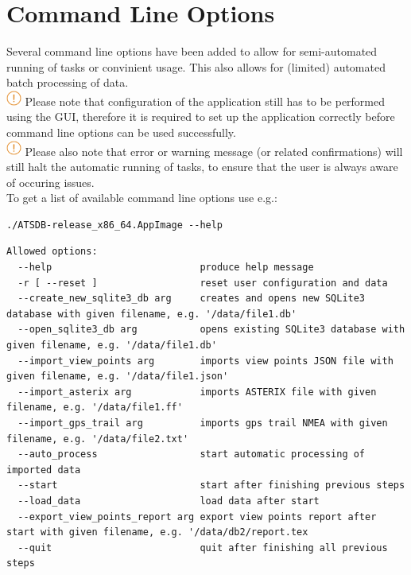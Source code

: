 \chapter{Command Line Options}
\label{sec:command_line} 

Several command line options have been added to allow for semi-automated running of tasks or convinient usage. This also allows for (limited) automated batch processing of data. \\

\includegraphics[width=0.5cm]{../../data/icons/hint.png} Please note that configuration of the application still has to be performed using the GUI, therefore it is required to set up the application correctly before command line options can be used successfully.\\

\includegraphics[width=0.5cm]{../../data/icons/hint.png} Please also note that error or warning message (or related confirmations) will still halt the automatic running of tasks, to ensure that the user is always aware of occuring issues. \\

To get a list of available command line options use e.g.:
\begin{lstlisting}
./ATSDB-release_x86_64.AppImage --help
\end{lstlisting}


\begin{lstlisting}
Allowed options:
  --help                          produce help message
  -r [ --reset ]                  reset user configuration and data
  --create_new_sqlite3_db arg     creates and opens new SQLite3 database with given filename, e.g. '/data/file1.db'
  --open_sqlite3_db arg           opens existing SQLite3 database with given filename, e.g. '/data/file1.db'
  --import_view_points arg        imports view points JSON file with given filename, e.g. '/data/file1.json'
  --import_asterix arg            imports ASTERIX file with given filename, e.g. '/data/file1.ff'
  --import_gps_trail arg          imports gps trail NMEA with given filename, e.g. '/data/file2.txt'
  --auto_process                  start automatic processing of imported data
  --start                         start after finishing previous steps
  --load_data                     load data after start
  --export_view_points_report arg export view points report after start with given filename, e.g. '/data/db2/report.tex
  --quit                          quit after finishing all previous steps

\end{lstlisting}
\ \\

